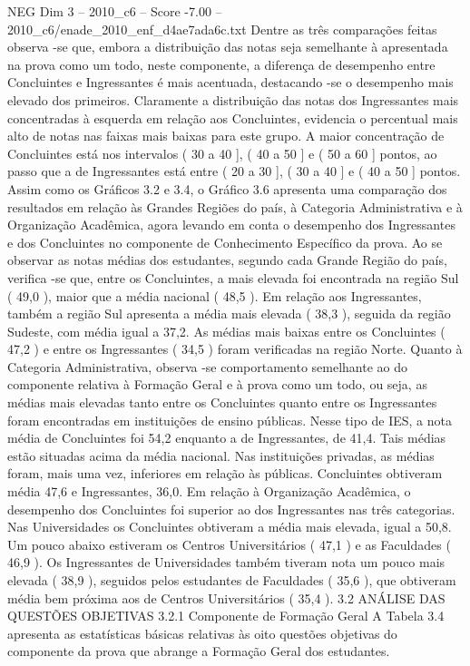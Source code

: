 \begin{textsample}{NEG Dim 3 – 2010\_c6 – Score -7.00 – 2010\_c6/enade\_2010\_enf\_d4ae7ada6c.txt}
Dentre as três comparações feitas observa -se que, embora a distribuição das notas seja semelhante à apresentada na prova como um todo, neste componente, a diferença de desempenho entre Concluintes e Ingressantes é mais acentuada, destacando -se o desempenho mais elevado dos primeiros.
Claramente a distribuição das notas dos Ingressantes mais concentradas à esquerda em relação aos Concluintes, evidencia o percentual mais alto de notas nas faixas mais baixas para este grupo.
A maior concentração de Concluintes está nos intervalos ( 30 a 40 ], ( 40 a 50 ] e ( 50 a 60 ] pontos, ao passo que a de Ingressantes está entre ( 20 a 30 ], ( 30 a 40 ] e ( 40 a 50 ] pontos.
Assim como os Gráficos 3.2 e 3.4, o Gráfico 3.6 apresenta uma comparação dos resultados em relação às Grandes Regiões do país, à Categoria Administrativa e à Organização Acadêmica, agora levando em conta o desempenho dos Ingressantes e dos Concluintes no componente de Conhecimento Específico da prova.
Ao se observar as notas médias dos estudantes, segundo cada Grande Região do país, verifica -se que, entre os Concluintes, a mais elevada foi encontrada na região Sul ( 49,0 ), maior que a média nacional ( 48,5 ).
Em relação aos Ingressantes, também a região Sul apresenta a média mais elevada ( 38,3 ), seguida da região Sudeste, com média igual a 37,2.
As médias mais baixas entre os Concluintes ( 47,2 ) e entre os Ingressantes ( 34,5 ) foram verificadas na região Norte.
Quanto à Categoria Administrativa, observa -se comportamento semelhante ao do componente relativa à Formação Geral e à prova como um todo, ou seja, as médias mais elevadas tanto entre os Concluintes quanto entre os Ingressantes foram encontradas em instituições de ensino públicas.
Nesse tipo de IES, a nota média de Concluintes foi 54,2 enquanto a de Ingressantes, de 41,4.
Tais médias estão situadas acima da média nacional.
Nas instituições privadas, as médias foram, mais uma vez, inferiores em relação às públicas.
Concluintes obtiveram média 47,6 e Ingressantes, 36,0.
Em relação à Organização Acadêmica, o desempenho dos Concluintes foi superior ao dos Ingressantes nas três categorias.
Nas Universidades os Concluintes obtiveram a média mais elevada, igual a 50,8.
Um pouco abaixo estiveram os Centros Universitários ( 47,1 ) e as Faculdades ( 46,9 ).
Os Ingressantes de Universidades também tiveram nota um pouco mais elevada ( 38,9 ), seguidos pelos estudantes de Faculdades ( 35,6 ), que obtiveram média bem próxima aos de Centros Universitários ( 35,4 ). 3.2 ANÁLISE DAS QUESTÕES OBJETIVAS 3.2.1 Componente de Formação Geral A Tabela 3.4 apresenta as estatísticas básicas relativas às oito questões objetivas do componente da prova que abrange a Formação Geral dos estudantes.

\end{textsample}
